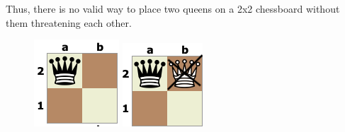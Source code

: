 \documentclass[12pt]{article}
\begin{document}
Thus, there is no valid way to place two queens on a 2x2 chessboard without them threatening each other.

\begin{figure}[h]
    \centering
    \begin{minipage}{0.2\textwidth}
        \centering
        \includegraphics[width=\textwidth]{Fig1.png}
    \end{minipage}
    \hspace{0.05\textwidth} %
    \begin{minipage}{0.2\textwidth}
        \centering
        \includegraphics[width=\textwidth]{Fig2.png}

\end{minipage}
\end{figure}
\end{document}
